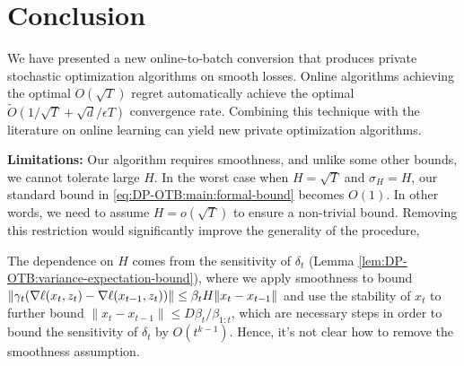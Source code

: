 \section{Conclusion}\label{sec:DP-OTB_conclusion}
We have presented a new online-to-batch conversion that produces private stochastic optimization algorithms on smooth losses. Online algorithms achieving the optimal $O(\sqrt{T})$ regret automatically achieve the optimal $\tilde O(1/\sqrt{T} + \sqrt{d}/\epsilon T)$ convergence rate. Combining this technique with the literature on online learning can yield new private optimization algorithms. 

\textbf{Limitations:} Our algorithm requires smoothness, and unlike some other bounds, we cannot tolerate large $H$. In the worst case when $H=\sqrt{T}$ and $\sigma_H=H$, our standard bound in \eqref{eq:DP-OTB:main:formal-bound} becomes $O(1)$. In other words, we need to assume $H=o(\sqrt{T})$ to ensure a non-trivial bound. Removing this restriction would significantly improve the generality of the procedure,

The dependence on $H$ comes from the sensitivity of $\delta_t$ (Lemma \ref{lem:DP-OTB:variance-expectation-bound}), where we apply smoothness to bound $\|\gamma_t(\nabla\ell(x_t,z_t)-\nabla\ell(x_{t-1},z_t))\|\leq \beta_t H \|x_t-x_{t-1}\|$ and use the stability of $x_t$ to further bound $\|x_t-x_{t-1}\| \leq D\beta_t/\beta_{1:t}$, which are necessary steps in order to bound the sensitivity of $\delta_t$ by $O(t^{k-1})$. Hence, it's not clear how to remove the smoothness assumption.